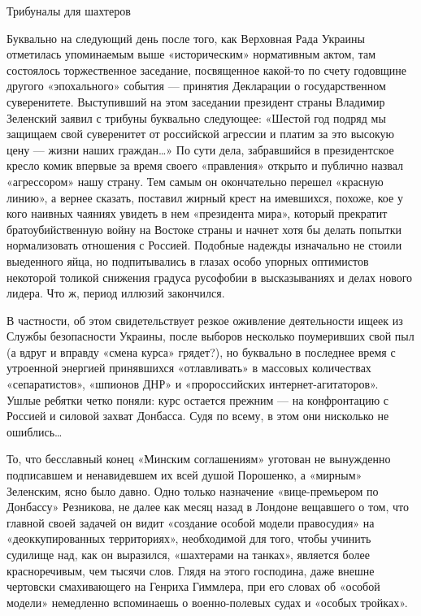 Трибуналы для шахтеров

Буквально на следующий день после того, как Верховная Рада Украины отметилась
упоминаемым выше «историческим» нормативным актом, там состоялось торжественное
заседание, посвященное какой-то по счету годовщине другого «эпохального»
события --- принятия Декларации о государственном суверенитете. Выступивший на
этом заседании президент страны Владимир Зеленский заявил с трибуны буквально
следующее: «Шестой год подряд мы защищаем свой суверенитет от российской
агрессии и платим за это высокую цену --- жизни наших граждан…» По сути дела,
забравшийся в президентское кресло комик впервые за время своего «правления»
открыто и публично назвал «агрессором» нашу страну. Тем самым он окончательно
перешел «красную линию», а вернее сказать, поставил жирный крест на имевшихся,
похоже, кое у кого наивных чаяниях увидеть в нем «президента мира», который
прекратит братоубийственную войну на Востоке страны и начнет хотя бы делать
попытки нормализовать отношения с Россией. Подобные надежды изначально не
стоили выеденного яйца, но подпитывались в глазах особо упорных оптимистов
некоторой толикой снижения градуса русофобии в высказываниях и делах нового
лидера. Что ж, период иллюзий закончился.

В частности, об этом свидетельствует резкое оживление деятельности ищеек из
Службы безопасности Украины, после выборов несколько поумеривших свой пыл (а
вдруг и вправду «смена курса» грядет?), но буквально в последнее время с
утроенной энергией принявшихся «отлавливать» в массовых количествах
«сепаратистов», «шпионов ДНР» и «пророссийских интернет-агитаторов». Ушлые
ребятки четко поняли: курс остается прежним --- на конфронтацию с Россией и
силовой захват Донбасса. Судя по всему, в этом они нисколько не ошиблись…

То, что бесславный конец «Минским соглашениям» уготован не вынужденно
подписавшем и ненавидевшем их всей душой Порошенко, а «мирным» Зеленским, ясно
было давно. Одно только назначение «вице-премьером по Донбассу» Резникова, не
далее как месяц назад в Лондоне вещавшего о том, что главной своей задачей он
видит «создание особой модели правосудия» на «деоккупированных территориях»,
необходимой для того, чтобы учинить судилище над, как он выразился, «шахтерами
на танках», является более красноречивым, чем тысячи слов. Глядя на этого
господина, даже внешне чертовски смахивающего на Генриха Гиммлера, при его
словах об «особой модели» немедленно вспоминаешь о военно-полевых судах и
«особых тройках».

